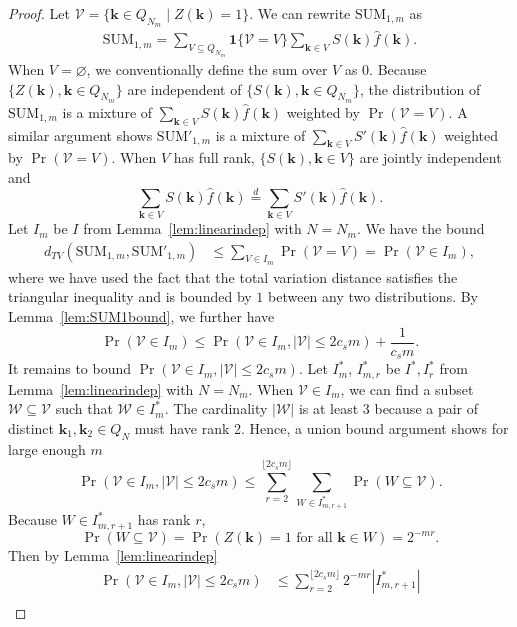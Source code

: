 \documentclass{article}
\theoremstyle{definition}
\renewcommand{\leq}{\leqslant}
\renewcommand{\emptyset}{\varnothing}
\newcommand{\bsk}{\boldsymbol{k}}
\newcommand{\bsone}{\boldsymbol{1}}
\begin{document}
\begin{proof}
Let $\mathcal{V}=\{\bsk\in Q_{N_m}\mid Z(\bsk)=1\}$. We can rewrite $\mathrm{SUM}_{1,m}$ as
    \begin{align*}
        \mathrm{SUM}_{1,m}=\sum_{V\subseteq Q_{N_m}}\bsone\{\mathcal{V}=V\}\sum_{\bsk\in V}S(\bsk)\hat{f}(\bsk).
    \end{align*}
    When $V=\emptyset$, we conventionally define the sum over $V$ as $0$. Because $\{Z(\bsk),\bsk\in Q_{N_m}\}$ are independent of $\{S(\bsk),\bsk\in Q_{N_m}\}$, the distribution of $\mathrm{SUM}_{1,m}$ is a mixture of $\sum_{\bsk\in V}S(\bsk)\hat{f}(\bsk)$ weighted by $\Pr(\mathcal{V}=V)$.
    A similar argument shows $\mathrm{SUM}'_{1,m}$ is a mixture of $\sum_{\bsk\in V}S'(\bsk)\hat{f}(\bsk)$ weighted by $\Pr(\mathcal{V}=V)$. When $V$ has full rank, $\{S(\bsk),\bsk\in V\}$ are jointly independent and 
    $$\sum_{\bsk\in V}S(\bsk)\hat{f}(\bsk)\overset{d}{=}\sum_{\bsk\in V}S'(\bsk)\hat{f}(\bsk).$$ 
    Let $I_m$ be $I$ from Lemma~\ref{lem:linearindep} with $N=N_m$. We have the bound 
    \begin{align}\label{eqn:dTV}
        d_{TV}(\mathrm{SUM}_{1,m},\mathrm{SUM}'_{1,m})&\leq \sum_{V\in I_m} \Pr(\mathcal{V}=V)=\Pr(\mathcal{V}\in I_m),
    \end{align}
    where we have used the fact that the total variation distance  satisfies the triangular inequality and is bounded by $1$ between any two distributions. By Lemma~\ref{lem:SUM1bound}, we further have
    $$\Pr(\mathcal{V}\in I_m)\leq \Pr(\mathcal{V}\in I_m, |\mathcal{V}|\leq 2c_sm ) + \frac{1}{c_sm}.$$
It remains to bound  $ \Pr(\mathcal{V}\in I_m, |\mathcal{V}|\leq 2c_sm ) $. Let $I^*_m$, $I^*_{m,r}$ be $I^*, I^*_r$ from Lemma~\ref{lem:linearindep} with $N=N_m$.
    When $\mathcal{V}\in I_m$, we can find a subset $\mathcal{W}\subseteq \mathcal{V}$ such that $\mathcal{W} \in I^*_m$. The cardinality $|\mathcal{W}|$ is at least $3$ because a pair of distinct $\bsk_1,\bsk_2 \in Q_N$ must have rank 2. Hence, a union bound argument shows for large enough $m$
    \begin{equation}\label{eqn:VIm}
    \Pr(\mathcal{V}\in I_m, |\mathcal{V}|\leq 2c_sm )  \leq \sum_{r=2}^{\lfloor2c_sm\rfloor} \sum_{W\in I^*_{m,r+1}}\Pr(W\subseteq \mathcal{V}).
    \end{equation}
    Because $W\in I^*_{m,r+1}$ has rank $r$, 
    $$\Pr(W\subseteq \mathcal{V})= \Pr(Z(\bsk)=1 \text{ for all } \bsk\in W)=2^{-mr}.$$
    Then by Lemma~\ref{lem:linearindep}
    \begin{align*}
        \Pr(\mathcal{V}\in I_m, |\mathcal{V}|\leq 2c_sm )  &\leq \sum_{r=2}^{\lfloor2c_sm\rfloor}2^{-mr}|I^*_{m,r+1}|\\\

\end{align*}
\end{proof}
\end{document}
